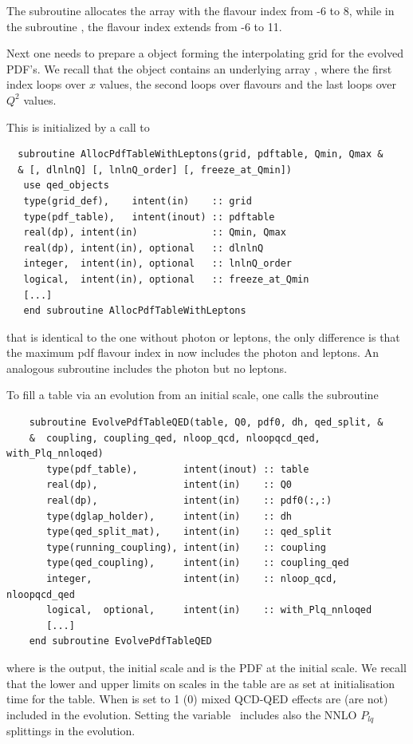 The subroutine  allocates the 
array with the flavour index from -6 to 8,
while in the subroutine ,
the flavour index extends from -6 to 11.



Next one needs to prepare a  object forming the
interpolating grid for the evolved PDF's. We recall that the
 object contains an underlying array ,
where the first index loops over $x$ values, the second loops over
flavours and the last loops over $Q^2$ values.


This is initialized by a call to 
\begin{lstlisting}
  subroutine AllocPdfTableWithLeptons(grid, pdftable, Qmin, Qmax & 
  & [, dlnlnQ] [, lnlnQ_order] [, freeze_at_Qmin])
   use qed_objects
   type(grid_def),    intent(in)    :: grid
   type(pdf_table),   intent(inout) :: pdftable
   real(dp), intent(in)             :: Qmin, Qmax
   real(dp), intent(in), optional   :: dlnlnQ
   integer,  intent(in), optional   :: lnlnQ_order
   logical,  intent(in), optional   :: freeze_at_Qmin
   [...]
   end subroutine AllocPdfTableWithLeptons
\end{lstlisting}
that is identical to the one without photon or leptons, the only difference is that the
maximum pdf flavour index in  now includes the photon and leptons.
%
An analogous subroutine  includes the
photon but no leptons.



To fill a table via an evolution from an initial scale, one calls the subroutine 
\begin{lstlisting}
    subroutine EvolvePdfTableQED(table, Q0, pdf0, dh, qed_split, &
    &  coupling, coupling_qed, nloop_qcd, nloopqcd_qed, with_Plq_nnloqed)
       type(pdf_table),        intent(inout) :: table
       real(dp),               intent(in)    :: Q0
       real(dp),               intent(in)    :: pdf0(:,:)
       type(dglap_holder),     intent(in)    :: dh
       type(qed_split_mat),    intent(in)    :: qed_split
       type(running_coupling), intent(in)    :: coupling
       type(qed_coupling),     intent(in)    :: coupling_qed
       integer,                intent(in)    :: nloop_qcd, nloopqcd_qed
       logical,  optional,     intent(in)    :: with_Plq_nnloqed
       [...]
    end subroutine EvolvePdfTableQED   
\end{lstlisting}
where  is the output,  the initial scale and
 is the PDF at the initial scale.
%
We recall that the lower and upper limits on 
scales in the table are as set at initialisation time for the table.
%
When  is set to 1 (0) mixed QCD-QED effects are
(are not) included in the evolution.
%
Setting the variable \ includes also the NNLO $P_{lq}$
splittings in the evolution.

